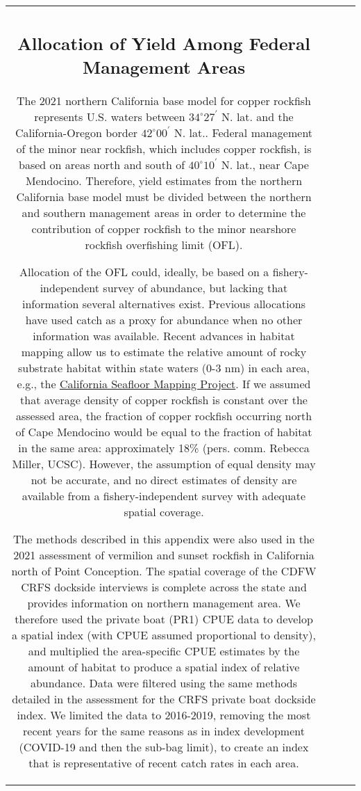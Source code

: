 \documentclass[11pt,
  letterpaper,
]{article}
\begin{document}
\begin{longtable}[t]{c>{\centering\arraybackslash}p{2cm}>{\centering\arraybackslash}p{2cm}>{\centering\arraybackslash}p{2cm}}
\subsection{Allocation of Yield Among Federal Management Areas}\label{allocation-of-yield-among-federal-management-areas}

The 2021 northern California base model for copper rockfish represents U.S. waters between $34^\circ 27^\prime$ N. lat. and the California-Oregon border $42^\circ 00^\prime$ N. lat.. Federal management of the minor near rockfish, which includes copper rockfish, is based on areas north and south of $40^\circ 10^\prime$ N. lat., near Cape Mendocino. Therefore, yield estimates from the northern California base model must be divided between the northern and southern management areas in order to determine the contribution of copper rockfish to the minor nearshore rockfish overfishing limit (OFL).

Allocation of the OFL could, ideally, be based on a fishery-independent survey of abundance, but lacking that information several alternatives exist. Previous allocations have used catch as a proxy for abundance when no other information was available. Recent advances in habitat mapping allow us to estimate the relative amount of rocky substrate habitat within state waters (0-3 nm) in each area, e.g., the \href{https://walrus.wr.usgs.gov/mapping/csmp/}{California Seafloor Mapping Project}. If we assumed that average density of copper rockfish is constant over the assessed area, the fraction of copper rockfish occurring north of Cape Mendocino would be equal to the fraction of habitat in the same area: approximately 18\% (pers. comm. Rebecca Miller, UCSC). However, the assumption of equal density may not be accurate, and no direct estimates of density are available from a fishery-independent survey with adequate spatial coverage.

The methods described in this appendix were also used in the 2021 assessment of vermilion and sunset rockfish in California north of Point Conception. The spatial coverage of the CDFW CRFS dockside interviews is complete across the state and provides information on northern management area. We therefore used the private boat (PR1) CPUE data to develop a spatial index (with CPUE assumed proportional to density), and multiplied the area-specific CPUE estimates by the amount of habitat to produce a spatial index of relative abundance. Data were filtered using the same methods detailed in the assessment for the CRFS private boat dockside index. We limited the data to 2016-2019, removing the most recent years for the same reasons as in index development (COVID-19 and then the sub-bag limit), to create an index that is representative of recent catch rates in each area.


\end{longtable}
\end{document}
